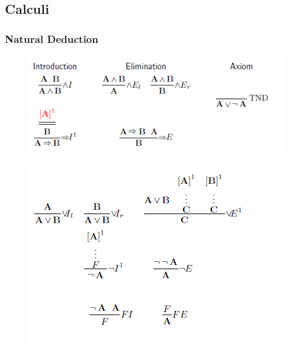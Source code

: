 \documentclass{scrartcl}
\begin{document}
\subsection{Calculi}
\subsubsection{Natural Deduction}
\begin{figure}[H]
            \centering
            \includegraphics[scale=0.8]{figures/295}
\end{figure}
\begin{figure}[H]
            \centering
            \includegraphics[scale=0.8]{figures/298}
\end{figure} 
\end{document}
